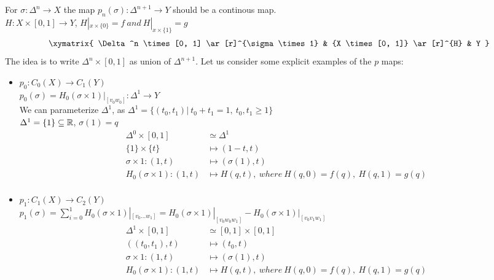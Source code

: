 \documentclass[11pt,a4paper]{report}
\begin{document}
        For $\sigma: \Delta^n \rightarrow X$ the map $p_n(\sigma): \Delta^{n+1} \rightarrow Y$ should be a continous map. \\
        $H: X \times [0, 1] \rightarrow Y$, $H|_{x \times \{0\}} = f \ and \ H|_{x \times \{1\}} = g $
        \[
         \xymatrix{
                        \Delta^n \times[0, 1] \ar[r]^{\sigma \times 1} &
                        {X \times [0, 1]} \ar[r]^{H} & Y  }
        \]
        The idea is to write $\Delta^n \times[0, 1]$ as union of $\Delta^{n+1}$.
        Let us consider some explicit examples of the $p$ maps:
        \begin{itemize}
         \item $p_0: C_0(X) \rightarrow C_1(Y)$ \\
         $p_0(\sigma) = H_0(\sigma \times 1) |_{[v_0w_0]}: \Delta^1 \rightarrow Y$ \\
         We can parameterize $\Delta^1$, as $\Delta^1 = \{ (t_0, t_1) | \ t_0 + t_1 = 1, \ t_0, t_1 \geq 1 \}$ \\
         $\Delta^1 = \{1\} \subseteq \mathbb{R}$, $\sigma(1) = q$ \\
         \begin{align*}
             \Delta^0 \times [0, 1] &\simeq \Delta^{1} \\
             \{1\} \times \{t\} &\mapsto (1-t, t) \\
             \sigma \times 1: (1, t) &\mapsto (\sigma(1), t) \\
            H_0( \sigma \times 1): (1, t) &\mapsto H(q, t), \ where \ H(q, 0) = f(q), \  H(q, 1) = g(q)\\
         \end{align*}
         \item $p_1: C_1(X) \rightarrow C_2(Y)$ \\
         $p_1(\sigma) = \sum_{i = 0}^1 H_0(\sigma \times 1) |_{[v_0 ... w_1]} = H_0(\sigma \times 1) |_{[v_0 w_0 w_1]} - H_0(\sigma \times 1) |_{[v_0 v_1 w_1]}$ \\
         \begin{align*}
             \Delta^1 \times [0, 1] &\simeq [0, 1] \times [0, 1] \\
             ((t_0, t_1), t) &\mapsto (t_0, t) \\
             \sigma \times 1: (1, t) &\mapsto (\sigma(1), t) \\
            H_0( \sigma \times 1): (1, t) &\mapsto H(q, t), \ where \ H(q, 0) = f(q), \  H(q, 1) = g(q)\\
         \end{align*}

\end{itemize}
\end{document}
